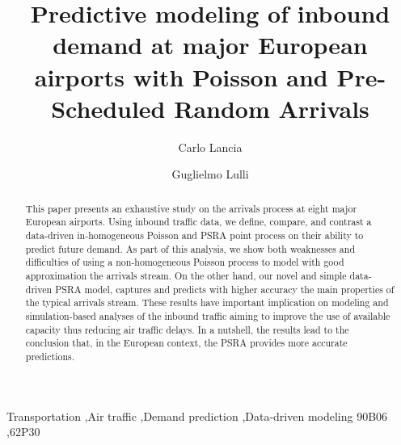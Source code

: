 \documentclass[draft,review]{elsarticle}
\begin{document}
\begin{frontmatter}

\title{Predictive modeling of inbound demand at major European airports with Poisson and Pre-Scheduled Random Arrivals}

\author[address_cl]{Carlo Lancia}

\author[address_gl]{Guglielmo Lulli}

\address[address_cl]{Leiden University Mathematical Institute, Niels Bohrweg 1, 2333 CA, Leiden, NL}
\address[address_gl]{Lancaster University Management School, Bailrigg, Lancaster, LA1 4YX, UK}

\begin{abstract}
  This paper presents an exhaustive study on the arrivals process at eight major European airports. Using inbound traffic data, we define, compare, and contrast a data-driven in-homogeneous Poisson and \ac{PSRA} point process on their ability to predict future demand.
As part of this analysis, we show both weaknesses and difficulties of using a non-homogeneous Poisson process to model with good approximation the arrivals stream. On the other hand, our novel and simple data-driven \ac{PSRA} model, captures and predicts with higher accuracy the main properties of the typical arrivals stream.
These results have important implication on modeling and simulation-based analyses of the inbound traffic aiming to improve the use of available capacity thus reducing air traffic delays. In a nutshell, the results lead to the conclusion that, in the European context, the \ac{PSRA} provides more accurate predictions.
\end{abstract}


\begin{keyword}
Transportation \sep Air traffic \sep Demand prediction \sep Data-driven modeling
\MSC[2010] 90B06 \sep  62P30
\end{keyword}

\end{frontmatter}
\end{document}
